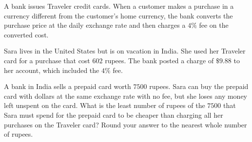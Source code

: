 A bank issues Traveler credit cards. When a customer makes a purchase in a currency different from the customer's home currency, the bank converts the purchase price at the daily exchange rate and then charges a $4\%$ fee on the converted cost.

Sara lives in the United States but is on vacation in India. She used her Traveler card for a purchase that cost $602$ rupees. The bank posted a charge of $\$9.88$ to her account, which included the $4\%$ fee.

A bank in India sells a prepaid card worth $7500$ rupees. Sara can buy the prepaid card with dollars at the same exchange rate with no fee, but she loses any money left unspent on the card. What is the least number of rupees of the $7500$ that Sara must spend for the prepaid card to be cheaper than charging all her purchases on the Traveler card? Round your answer to the nearest whole number of rupees.
